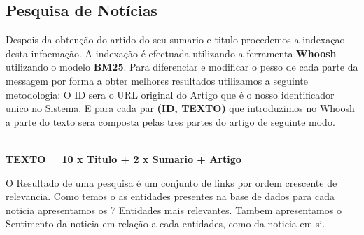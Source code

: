 \subsection{Pesquisa de Notícias}
\label{sec:news_search}
\hspace{15pt}Despois da obtenção do artido do seu sumario e titulo procedemos a indexaçao desta infoemação. A indexação é efectuada utilizando a ferramenta \textbf{Whoosh} utilizando o modelo \textbf{BM25}. Para diferenciar e modificar o pesso de cada parte da messagem por forma a obter melhores resultados utilizamos a seguinte metodologia: O ID sera o URL original do Artigo que é o nosso identificador unico no Sistema. E para cada par \textbf{(ID, TEXTO)} que introduzimos no Whoosh a parte do texto sera composta pelas tres partes do artigo de seguinte modo.\\\\
\centerline{\textbf{TEXTO = 10 x Titulo + 2 x Sumario + Artigo}}
\newline\newline
\hspace{15pt}O Resultado de uma pesquisa é um conjunto de links por ordem crescente de relevancia. Como temos o as entidades presentes na base de dados para cada noticia apresentamos os 7 Entidades mais relevantes. Tambem apresentamos o Sentimento da noticia em relação a cada entidades, como da noticia em si.